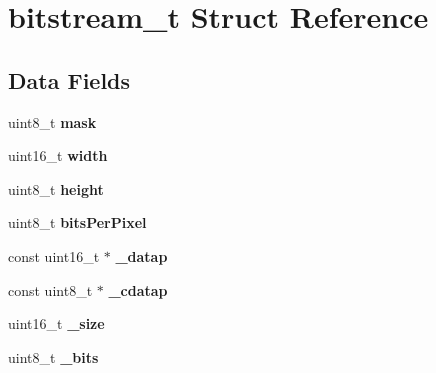 \hypertarget{structbitstream__t}{}\section{bitstream\+\_\+t Struct Reference}
\label{structbitstream__t}
\subsection*{Data Fields}
\begin{DoxyCompactItemize}
\item 
uint8\+\_\+t {\bfseries mask}\hypertarget{structbitstream__t_a8a74907784be6c7786c2d060c8d7e10b}{}\label{structbitstream__t_a8a74907784be6c7786c2d060c8d7e10b}

\item 
uint16\+\_\+t {\bfseries width}\hypertarget{structbitstream__t_ad0eab1042455a2067c812ab8071d5376}{}\label{structbitstream__t_ad0eab1042455a2067c812ab8071d5376}

\item 
uint8\+\_\+t {\bfseries height}\hypertarget{structbitstream__t_adcf201a8aabf55cb352ec05331242594}{}\label{structbitstream__t_adcf201a8aabf55cb352ec05331242594}

\item 
uint8\+\_\+t {\bfseries bits\+Per\+Pixel}\hypertarget{structbitstream__t_a6a3c851ca52ea8aa201b6753a4585736}{}\label{structbitstream__t_a6a3c851ca52ea8aa201b6753a4585736}

\item 
const uint16\+\_\+t $\ast$ {\bfseries \+\_\+datap}\hypertarget{structbitstream__t_ac6b93613aac5d1f99bb7110cd3225c50}{}\label{structbitstream__t_ac6b93613aac5d1f99bb7110cd3225c50}

\item 
const uint8\+\_\+t $\ast$ {\bfseries \+\_\+cdatap}\hypertarget{structbitstream__t_a6fa0b0c0df2bc324f2e6bdc034128700}{}\label{structbitstream__t_a6fa0b0c0df2bc324f2e6bdc034128700}

\item 
uint16\+\_\+t {\bfseries \+\_\+size}\hypertarget{structbitstream__t_aa634b952549ebb0aa1c5f90330b66f76}{}\label{structbitstream__t_aa634b952549ebb0aa1c5f90330b66f76}

\item 
uint8\+\_\+t {\bfseries \+\_\+bits}\hypertarget{structbitstream__t_ac7b691cab37efadfad1f6f8739dfe125}{}\label{structbitstream__t_ac7b691cab37efadfad1f6f8739dfe125}


\end{DoxyCompactItemize}
